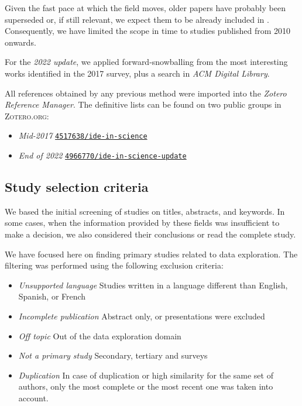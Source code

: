 Given the fast pace at which the field moves, older papers have probably been
superseded or, if still relevant, we expect them to be already included in \cite{Idreos2015}.
Consequently, we have limited the scope in time to studies published from 2010 onwards.


For the \emph{2022 update}, we applied forward-snowballing from the most interesting works
identified in the 2017 survey, plus a search in \emph{ACM Digital Library}.


All references obtained by any previous method were imported into
the \emph{Zotero Reference Manager}. The definitive lists can be found on two public groups in
\textsc{Zotero.org}:

\begin{itemize}
    \item \emph{Mid-2017} \href{https://www.zotero.org/groups/4517638/ide-in-science/library}{\texttt{4517638/ide-in-science}}
    \item \emph{End of 2022} \href{https://www.zotero.org/groups/4966770/ide-in-science-update/library}{\texttt{4966770/ide-in-science-update}}
\end{itemize}

\subsection{Study selection criteria}
We based the initial screening of studies on titles, abstracts, and keywords.
In some cases, when the information provided by these fields was
insufficient to make a decision, we also considered their conclusions
or read the complete study.

We have focused here on finding primary studies related to data exploration.
The filtering was performed using the following exclusion criteria:

\begin{itemize}
  \item \emph{Unsupported language} Studies written in a language different than
  English, Spanish, or French
  \item \emph{Incomplete publication} Abstract only, or presentations were excluded
  \item \emph{Off topic} Out of the data exploration domain
  \item \emph{Not a primary study} Secondary, tertiary and surveys
  \item \emph{Duplication} In case of duplication or high similarity for the same
  set of authors, only the most complete or the most recent one was
  taken into account.
\end{itemize}

